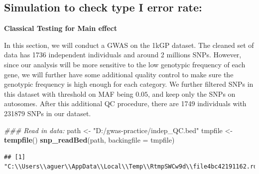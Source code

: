 \documentclass[
]{article}
\newenvironment{Shaded}{\begin{snugshade}}{\end{snugshade}}
\newcommand{\CommentTok}[1]{\textcolor[rgb]{0.56,0.35,0.01}{\textit{#1}}}
\newcommand{\DataTypeTok}[1]{\textcolor[rgb]{0.13,0.29,0.53}{#1}}
\newcommand{\DecValTok}[1]{\textcolor[rgb]{0.00,0.00,0.81}{#1}}
\newcommand{\KeywordTok}[1]{\textcolor[rgb]{0.13,0.29,0.53}{\textbf{#1}}}
\newcommand{\NormalTok}[1]{#1}
\newcommand{\OperatorTok}[1]{\textcolor[rgb]{0.81,0.36,0.00}{\textbf{#1}}}
\newcommand{\StringTok}[1]{\textcolor[rgb]{0.31,0.60,0.02}{#1}}
\begin{document}
\hypertarget{simulation-to-check-type-i-error-rate}{%
\subsection{Simulation to check type I error
rate:}\label{simulation-to-check-type-i-error-rate}}

\textbf{Classical Testing for Main effect}

In this section, we will conduct a GWAS on the 1kGP dataset. The cleaned
set of data has 1736 independent individuals and around 2 millions SNPs.
However, since our analysis will be more sensitive to the low genotypic
frequency of each gene, we will further have some additional quality
control to make sure the genotypic frequency is high enough for each
category. We further filtered SNPs in this dataset with threshold on MAF
being \(0.05\), and keep only the SNPs on autosomes. After this
additional QC procedure, there are 1749 individuals with 231879 SNPs in
our dataset.

\begin{Shaded}
\begin{Highlighting}[]
\CommentTok{### Read in data:}
\NormalTok{path <-}\StringTok{ "D:/gwas-practice/indep_QC.bed"}
\NormalTok{tmpfile  <-}\StringTok{ }\KeywordTok{tempfile}\NormalTok{()}
\KeywordTok{snp_readBed}\NormalTok{(path, }\DataTypeTok{backingfile =}\NormalTok{ tmpfile)}
\end{Highlighting}
\end{Shaded}

\begin{verbatim}
## [1] "C:\\Users\\aguer\\AppData\\Local\\Temp\\RtmpSWCw9d\\file4bc42191162.rds"
\end{verbatim}

\begin{Shaded}
\end{Shaded}
\end{document}
